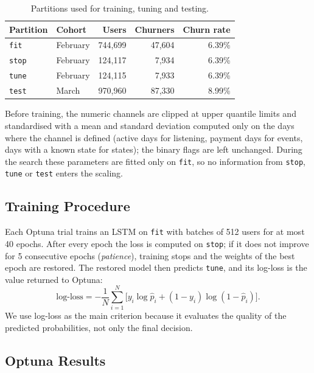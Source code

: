 \documentclass{article}
\begin{document}
\begin{table}[H]
\centering
\renewcommand{\arraystretch}{1.3}
\begin{tabular}{|l|l|r|r|r|}
\hline
\textbf{Partition} & \textbf{Cohort} & \textbf{Users} & \textbf{Churners} & \textbf{Churn rate} \\ \hline
\texttt{fit}  & February & 744{,}699 & 47{,}604 & 6.39\% \\ \hline
\texttt{stop} & February & 124{,}117 & 7{,}934  & 6.39\% \\ \hline
\texttt{tune} & February & 124{,}115 & 7{,}933  & 6.39\% \\ \hline
\texttt{test} & March    & 970{,}960 & 87{,}330 & 8.99\% \\ \hline
\end{tabular}
\caption{Partitions used for training, tuning and testing.}
\label{tab:w2_split}
\end{table}

Before training, the numeric channels are clipped at upper quantile limits and standardised with a mean and standard deviation computed only on the days where the channel is defined (active days for listening, payment days for events, days with a known state for states); the binary flags are left unchanged. During the search these parameters are fitted only on \texttt{fit}, so no information from \texttt{stop}, \texttt{tune} or \texttt{test} enters the scaling.

\subsection{Training Procedure}

Each Optuna trial trains an LSTM on \texttt{fit} with batches of 512 users for at most 40 epochs. After every epoch the loss is computed on \texttt{stop}; if it does not improve for 5 consecutive epochs (\emph{patience}), training stops and the weights of the best epoch are restored. The restored model then predicts \texttt{tune}, and its log-loss is the value returned to Optuna:
\begin{equation}
\text{log-loss} = -\frac{1}{N} \sum_{i=1}^{N} \Big[ y_i \log \hat{p}_i + (1 - y_i) \log(1 - \hat{p}_i) \Big].
\end{equation}
We use log-loss as the main criterion because it evaluates the quality of the predicted probabilities, not only the final decision.

\subsection{Optuna Results}
\end{document}
